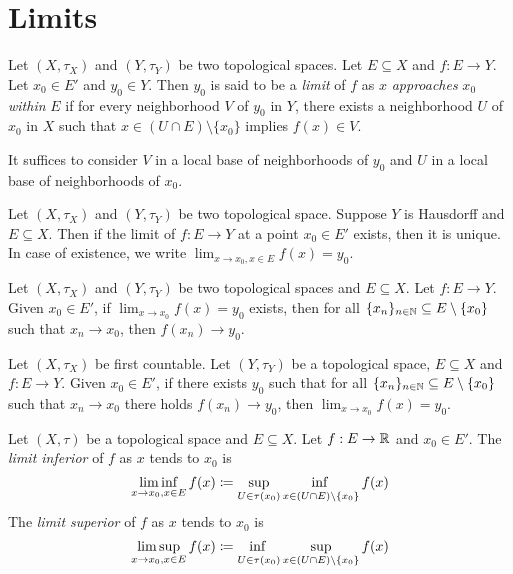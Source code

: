 \documentclass[screen,single]{techreport}
\numberwithin{equation}{section}
\begin{document}
\section{Limits}

\begin{definition}\label{De:Limits}
	Let $(X,\tau_X)$ and $(Y,\tau_Y)$ be two topological spaces.
	Let $E \subseteq X$ and $f: E \to Y$.
	Let $x_0 \in E'$ and $y_0 \in Y$.
	Then $y_0$ is said to be a \emph{limit} of $f$ as $x$ \emph{approaches} $x_0$ \emph{within} $E$ if for every neighborhood $V$ of $y_0$ in $Y$, there exists a neighborhood $U$ of $x_0$ in $X$ such that
	$x \in (U \cap E) \setminus \{x_0\}$ implies $f(x) \in V$.
\end{definition}

\begin{remark}\label{Rem:LimitsConsiderLocalbase}
	It suffices to consider $V$ in a local base of neighborhoods of $y_0$ and $U$ in a local base of neighborhoods of $x_0$.
\end{remark}

\begin{proposition}\label{Prop:LimitIntoT2AtMostOne}
	Let $(X,\tau_X)$ and $(Y,\tau_Y)$ be two topological space.
	Suppose $Y$ is Hausdorff and $E \subseteq X$.
	Then if the limit of $f : E \to Y$ at a point $x_0 \in E'$ exists, then it is unique.
	In case of existence, we write $\lim_{x \to x_0, x \in E} f(x) = y_0$.
\end{proposition}

\begin{proposition}\label{Prop:LimitImlySeqConv}
	Let $(X,\tau_X)$ and $(Y,\tau_Y)$ be two topological spaces and $E \subseteq X$.
	Let $f : E \to Y$.
	Given $x_0 \in E'$, if $\lim_{x \to x_0} f(x) = y_0$ exists, then for all $\{x_n\}_{n \in \mathbb{N}} \subseteq E \setminus \{x_0\}$ such that $x_n \rightarrow x_0$, then $f(x_n) \rightarrow y_0$.
\end{proposition}

\begin{proposition}\label{Prop:LimitFromFstCountExistIfSeqConv}
	Let $(X,\tau_X)$ be first countable.
	Let $(Y,\tau_Y)$ be a topological space, $E \subseteq X$ and $f: E \to Y$.
	Given $x_0 \in E'$, if there exists $y_0$ such that for all $\{x_n\}_{n \in \mathbb{N}} \subseteq E \setminus \{x_0\}$ such that $x_n \rightarrow x_0$ there holds $f(x_n) \rightarrow y_0$, then $\lim_{x \to x_0} f(x) = y_0$.
\end{proposition}

\begin{definition}\label{De:LimitInfAndSup}
	Let $(X,\tau)$ be a topological space and $E \subseteq X$.
	Let $f : E \to \mathbb{R}$ and $x_0 \in E'$.
	The \emph{limit inferior} of $f$ as $x$ tends to $x_0$ is
	\[
 	\liminf_{x \to x_0, x \in E} f(x) \coloneqq \adjustlimits \sup_{U \in \tau(x_0)} \inf_{x \in (U \cap E) \setminus \{x_0\}} f(x)
	\]
	The \emph{limit superior} of $f$ as $x$ tends to $x_0$ is
	\[
	\limsup_{x \to x_0, x \in E} f(x) \coloneqq \adjustlimits \inf_{U \in \tau(x_0)} \sup_{x \in (U \cap E) \setminus \{x_0\}} f(x)
	\]
\end{definition}
\end{document}
